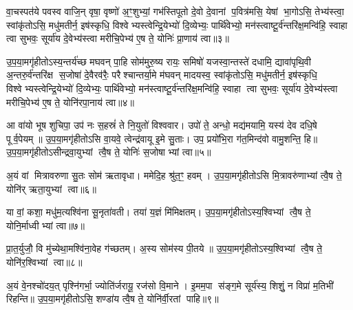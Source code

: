 {\anuvakamend[{यु॒ष्माकꣵ॑ स्वर॒ यत्ते॒ नव॑ च॥१॥}]}

वा॒चस्पत॑ये पवस्व वाजि॒न् वृषा॒ वृष्णो॑ अ॒ꣳ॒शुभ्यां॒ गभ॑स्तिपूतो दे॒वो दे॒वानां प॒वित्र॑मसि॒ येषां भा॒गोऽसि॒ तेभ्य॑स्त्वा॒ स्वांकृ॑तोऽसि॒ मधु॑मतीर्न॒ इष॑स्कृधि॒ विश्वेभ्यस्त्वेन्द्रि॒येभ्यो॑ दि॒व्येभ्यः॒ पार्थि॑वेभ्यो॒ मन॑स्त्वाष्टू॒र्व॑न्तरि॑क्ष॒मन्वि॑हि॒ स्वाहा त्वा सुभवः॒ सूर्या॑य दे॒वेभ्य॑स्त्वा मरीचि॒पेभ्य॑ ए॒ष ते॒ योनिः॑ प्रा॒णाय॑ त्वा॥३॥

{\anuvakamend[{वा॒चः स॒प्तच॑त्वारिशत्॥२॥}]}

उ॒प॒या॒मगृ॑हीतोऽस्य॒न्तर्य॑च्छ मघवन् पा॒हि सोम॑मुरु॒ष्य रायः॒ समिषो॑ यजस्वा॒न्तस्ते॑ दधामि॒ द्यावा॑पृथि॒वी अ॒न्तरु॒र्व॑न्तरि॑क्ष स॒जोषा॑ दे॒वैरव॑रैः॒ परैश्चान्तर्या॒मे म॑घवन् मादयस्व॒ स्वांकृ॑तोऽसि॒ मधु॑मतीर्न॒ इष॑स्कृधि॒ विश्वेभ्यस्त्वेन्द्रि॒येभ्यो॑ दि॒व्येभ्यः॒ पार्थि॑वेभ्यो॒ मन॑स्त्वाष्टू॒र्व॑न्तरि॑क्ष॒मन्वि॑हि॒ स्वाहा त्वा सुभवः॒ सूर्या॑य दे॒वेभ्य॑स्त्वा मरीचि॒पेभ्य॑ ए॒ष ते॒ योनि॑रपा॒नाय॑ त्वा॥४॥

{\anuvakamend[{दे॒वेभ्यः॑ स॒प्त च॑॥३॥}]}

आ वा॑यो भूष शुचिपा॒ उप॑ नः स॒हस्रं॑ ते नि॒युतो॑ विश्ववार। उपो॑ ते॒ अन्धो॒ मद्य॑मयामि॒ यस्य॑ देव दधि॒षे पूर्व॒पेयम्॥ उ॒प॒या॒मगृ॑हीतोऽसि वा॒यवे॒ त्वेन्द्र॑वायू इ॒मे सु॒ताः। उप॒ प्रयो॑भि॒रा ग॑त॒मिन्द॑वो वामु॒शन्ति॒ हि॥ उ॒प॒या॒मगृ॑हीतोऽसीन्द्रवा॒युभ्यां त्वै॒ष ते॒ योनिः॑ स॒जोषाभ्यां त्वा॥५॥

{\anuvakamend[{आ वा॑यो॒ त्रिच॑त्वारिशत्॥४॥}]}

अ॒यं वां मित्रावरुणा सु॒तः सोम॑ ऋतावृधा। ममेदि॒ह श्रु॑त॒ꣳ॒ हवम्। उ॒प॒या॒मगृ॑हीतोऽसि मि॒त्रावरु॑णाभ्यां त्वै॒ष ते॒ योनि॑र् ऋता॒युभ्यां त्वा॥६॥

{\anuvakamend[{अ॒यं वां विश॒तिः॥५॥}]}

या वां॒ कशा॒ मधु॑म॒त्यश्वि॑ना सू॒नृता॑वती। तया॑ य॒ज्ञं मि॑मिक्षतम्। उ॒प॒या॒मगृ॑हीतोऽस्य॒श्विभ्यां त्वै॒ष ते॒ योनि॒र्माध्वीभ्यां त्वा॥७॥

{\anuvakamend[{या वा॑म॒ष्टाद॑श॥६॥}]}

प्रा॒त॒र्युजौ॒ वि मु॑च्येथा॒मश्वि॑ना॒वेह ग॑च्छतम्। अ॒स्य सोम॑स्य पी॒तये॥ उ॒प॒या॒मगृ॑हीतोऽस्य॒श्विभ्यां त्वै॒ष ते॒ योनि॑र॒श्विभ्यां त्वा॥८॥

{\anuvakamend[{प्रा॒त॒र्युजा॒वेका॒न्नविꣳ॑शतिः॥७॥}]}

अ॒यं वे॒नश्चो॑दय॒त् पृश्नि॑गर्भा॒ ज्योति॑र्जरायू॒ रज॑सो वि॒माने। इ॒मम॒पा स॑ङ्ग॒मे सूर्य॑स्य॒ शिशुं॒ न विप्रा॑ म॒तिभी॑ रिहन्ति॥ उ॒प॒या॒मगृ॑हीतोऽसि॒ शण्डा॑य त्वै॒ष ते॒ योनि॑र्वी॒रतां पाहि॥९॥

